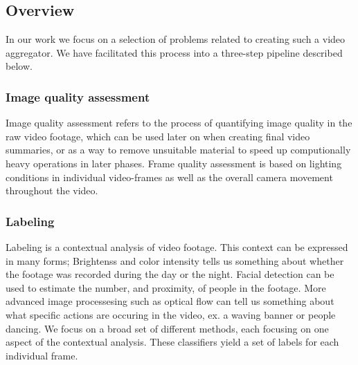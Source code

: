 \subsection{Overview}
%
In our work we focus on a selection of problems related to creating such a video aggregator. We have facilitated this process into a three-step pipeline described below.
%
\subsubsection{Image quality assessment}\label{sec:videoclipsegmentation}
%
Image quality assessment refers to the process of quantifying image quality in the raw video footage, %
which can be used later on when creating final video summaries, or as a way to remove unsuitable material to speed up computionally heavy operations in later phases. %
Frame quality assessment is based on lighting conditions in individual video-frames as well as the overall camera movement throughout the video.
%
\subsubsection{Labeling}
%
Labeling is a contextual analysis of video footage. This context can be expressed in many forms; Brightenss and color intensity tells us something about whether the footage was recorded during the day or the night. Facial detection can be used to estimate the number, and proximity, of people in the footage. More advanced image processesing such as optical flow can tell us something about what specific actions are occuring in the video, ex. a waving banner or people dancing. We focus on a broad set of different methods, each focusing on one aspect of the contextual analysis. These classifiers yield a set of labels for each individual frame.
%

